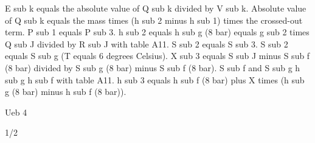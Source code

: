 E sub k equals the absolute value of Q sub k divided by V sub k. Absolute value of Q sub k equals the mass times (h sub 2 minus h sub 1) times the crossed-out term. P sub 1 equals P sub 3. h sub 2 equals h sub g (8 bar) equals g sub 2 times Q sub J divided by R sub J with table A11. S sub 2 equals S sub 3. S sub 2 equals S sub g (T equals 6 degrees Celsius). X sub 3 equals S sub J minus S sub f (8 bar) divided by S sub g (8 bar) minus S sub f (8 bar). S sub f and S sub g h sub g h sub f with table A11. h sub 3 equals h sub f (8 bar) plus X times (h sub g (8 bar) minus h sub f (8 bar)). 

Ueb 4

1/2